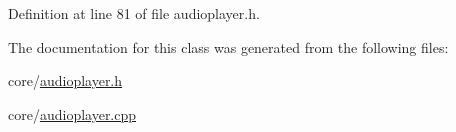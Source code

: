 Definition at line 81 of file audioplayer.\+h.



The documentation for this class was generated from the following files\+:\begin{DoxyCompactItemize}
\item 
core/\hyperlink{audioplayer_8h}{audioplayer.\+h}\item 
core/\hyperlink{audioplayer_8cpp}{audioplayer.\+cpp}\end{DoxyCompactItemize}
